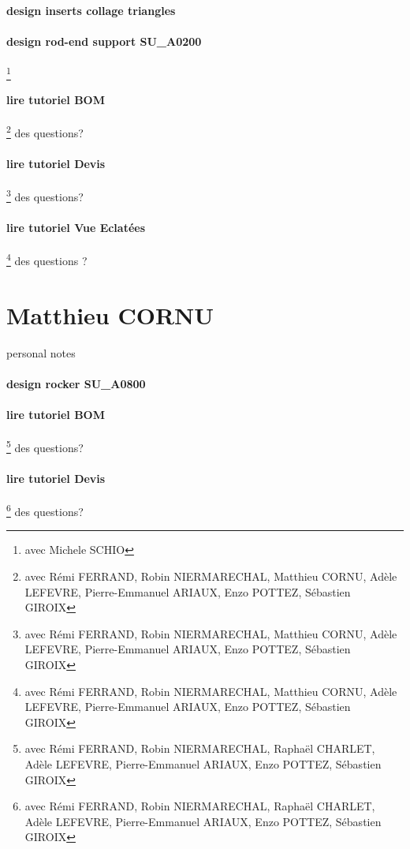 \paragraph{design inserts collage triangles} 
\paragraph{design rod-end support SU\_A0200} \footnote{avec Michele SCHIO} 
\paragraph{lire tutoriel BOM} \footnote{avec Rémi FERRAND, Robin NIERMARECHAL, Matthieu CORNU, Adèle LEFEVRE, Pierre-Emmanuel ARIAUX, Enzo POTTEZ, Sébastien GIROIX} des questions?
\paragraph{lire tutoriel Devis} \footnote{avec Rémi FERRAND, Robin NIERMARECHAL, Matthieu CORNU, Adèle LEFEVRE, Pierre-Emmanuel ARIAUX, Enzo POTTEZ, Sébastien GIROIX} des questions?
\paragraph{lire tutoriel Vue Eclatées} \footnote{avec Rémi FERRAND, Robin NIERMARECHAL, Matthieu CORNU, Adèle LEFEVRE, Pierre-Emmanuel ARIAUX, Enzo POTTEZ, Sébastien GIROIX} des questions ?
\newpage \section*{Matthieu CORNU} 
 \par personal notes
\paragraph{design rocker SU\_A0800} 
\paragraph{lire tutoriel BOM} \footnote{avec Rémi FERRAND, Robin NIERMARECHAL, Raphaël CHARLET, Adèle LEFEVRE, Pierre-Emmanuel ARIAUX, Enzo POTTEZ, Sébastien GIROIX} des questions?
\paragraph{lire tutoriel Devis} \footnote{avec Rémi FERRAND, Robin NIERMARECHAL, Raphaël CHARLET, Adèle LEFEVRE, Pierre-Emmanuel ARIAUX, Enzo POTTEZ, Sébastien GIROIX} des questions?
